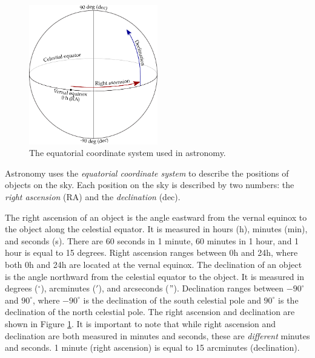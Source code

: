             \begin{figure}
                \centering
                \includegraphics[width=0.5\textwidth]{images/ra-dec}
                \caption{The equatorial coordinate system used in astronomy.}
                \label{fig:equatorial-coordinates}
            \end{figure}

            Astronomy uses the \emph{equatorial coordinate system} to describe
            the positions of objects on the sky. Each position on the sky is
            described by two numbers: the \emph{right ascension} (RA) and the
            \emph{declination} (dec).

            The right ascension of an object is the angle eastward from the
            vernal equinox to the object along the celestial equator. It is
            measured in hours (h), minutes (min), and seconds (s). There are 60
            seconds in 1 minute, 60 minutes in 1 hour, and 1 hour is equal to 15
            degrees. Right ascension ranges between 0h and 24h, where both 0h
            and 24h are located at the vernal equinox. The declination of an
            object is the angle northward from the celestial equator to the
            object. It is measured in degrees (${}^\circ$), arcminutes ($'$),
            and arcseconds ($"$). Declination ranges between $-90^\circ$ and
            $90^\circ$, where $-90^\circ$ is the declination of the south
            celestial pole and $90^\circ$ is the declination of the north
            celestial pole. The right ascension and declination are shown in
            Figure \ref{fig:equatorial-coordinates}. It is important to note
            that while right ascension and declination are both measured in
            minutes and seconds, these are \emph{different} minutes and seconds.
            1 minute (right ascension) is equal to 15 arcminutes (declination).

